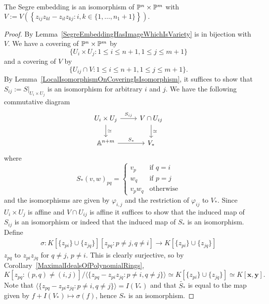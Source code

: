     \begin{lemma}
        The Segre embedding is an isomorphism of $\mathbb{P}^n\times \mathbb{P}^m$ with $V:=V(\left\{z_{ij}z_{kl} - z_{il}z_{kj} : i,k\in\{1,\dots, n_1+1\}\right\}).$ 
    \end{lemma}
    \begin{proof}
        By Lemma~\ref{SegreEmbeddingHasImageWhichIsVariety} is in bijection with $V$. We have a covering of $\mathbb{P}^n\times \mathbb{P}^m$ by $$\{ U_i\times U_j : 1\leq i\leq n+1, 1\leq j\leq m+1\}$$ 
        and a covering of $V$ by 
        $$\{U_{ij}\cap V : 1\leq i\leq n+1 , 1\leq j\leq m+1\}.$$
        By Lemma~\ref{LocalIsomorphismOnCoveringIsIsomorphism}, it suffices to show that $S_{ij}:=\left.S\right|_{U_i\times U_j}$ is an isomorphism for arbitrary $i$ and $j$. We have the following commutative diagram
        $$\begin{tikzcd}
            U_i\times U_j \arrow[r,"S_{ij}"] \arrow[d, "\simeq"] & V\cap U_{ij} \arrow[d, "\simeq"]\\
            \A^{n+m} \arrow[r, "S_\ast"] & V_\ast
        \end{tikzcd} $$
        where
        $$S_\ast(v,w)_{pq} = \begin{cases}
            v_{p} & \text{if } q=i\\
            w_q & \text{if } p=j\\
            v_pw_q & \text{otherwise}
        \end{cases}$$
        and the isomorphisms are given by $\varphi_{i,j}$ and the restriction of $\varphi_{ij}$ to $V_\ast$. Since $U_i\times U_j$ is affine and $V\cap U_{ij}$ is affine it suffices to show that the induced map of $S_{ij}$ is an isomorphism or indeed that the induced map of $S_\ast$ is an isomorphism.
        Define 
        \begin{gather*}
            \sigma: K[\{z_{pi}\}\cup\{z_{jq}\}][z_{pq} : p\neq j, q\neq i]\rightarrow K[\{z_{pi}\}\cup \{z_{jq}\}]
        \end{gather*}
        $z_{pq}$ to $z_{pi}z_{jq}$ for $q\neq j$, $p\neq i$. This is clearly surjective, so by Corollary~\ref{MaximalIdealsOfPolynomialRings}, 
        $$K[z_{pq}: (p,q)\neq (i,j)]/\langle \{z_{pq}-z_{pi}z_{jq} : p\neq i,q\neq j\}\rangle\simeq K[\{z_{pi}\}\cup \{z_{jq}\}]\simeq K[\mathbf{x},\mathbf{y}].$$
        Note that $\langle \{z_{pq}-z_{pi}z_{jq} : p\neq i,q\neq j\}\rangle = I(V_\ast)$ and that $\widetilde{S_\ast}$ is equal to the map given by $f+I(V_\ast)\mapsto \sigma(f)$, hence $S_\ast$ is an isomorphism.
    \end{proof}
